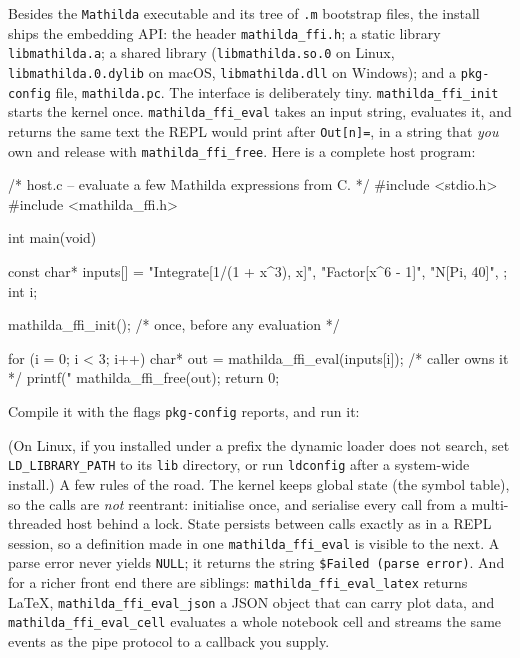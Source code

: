 \noindent
Besides the \texttt{Mathilda} executable and its tree of \texttt{.m} bootstrap files,
the install ships the embedding API: the header \texttt{mathilda\_ffi.h}; a static
library \texttt{libmathilda.a}; a shared library (\texttt{libmathilda.so.0} on Linux,
\texttt{libmathilda.0.dylib} on macOS, \texttt{libmathilda.dll} on Windows); and a
\texttt{pkg-config} file, \texttt{mathilda.pc}. The interface is deliberately tiny.
\texttt{mathilda\_ffi\_init} starts the kernel once. \texttt{mathilda\_ffi\_eval} takes
an input string, evaluates it, and returns the same text the REPL would print after
\texttt{Out[n]=}, in a string that \emph{you} own and release with
\texttt{mathilda\_ffi\_free}. Here is a complete host program:

\begin{ccode}
/* host.c -- evaluate a few Mathilda expressions from C. */
#include <stdio.h>
#include <mathilda_ffi.h>

int main(void)
{
    const char* inputs[] = {
        "Integrate[1/(1 + x^3), x]",
        "Factor[x^6 - 1]",
        "N[Pi, 40]",
    };
    int i;

    mathilda_ffi_init();                 /* once, before any evaluation */

    for (i = 0; i < 3; i++) {
        char* out = mathilda_ffi_eval(inputs[i]);   /* caller owns it */
        printf("%
        mathilda_ffi_free(out);
    }
    return 0;
}
\end{ccode}

\noindent
Compile it with the flags \texttt{pkg-config} reports, and run it:


\noindent
(On Linux, if you installed under a prefix the dynamic loader does not search, set
\texttt{LD\_LIBRARY\_PATH} to its \texttt{lib} directory, or run \texttt{ldconfig}
after a system-wide install.) A few rules of the road. The kernel keeps global state
(the symbol table), so the calls are \emph{not} reentrant: initialise once, and
serialise every call from a multi-threaded host behind a lock. State persists between
calls exactly as in a REPL session, so a definition made in one
\texttt{mathilda\_ffi\_eval} is visible to the next. A parse error never yields
\texttt{NULL}; it returns the string \texttt{\$Failed (parse error)}. And for a
richer front end there are siblings: \texttt{mathilda\_ffi\_eval\_latex} returns
\LaTeX, \texttt{mathilda\_ffi\_eval\_json} a JSON object that can carry plot data,
and \texttt{mathilda\_ffi\_eval\_cell} evaluates a whole notebook cell and streams
the same events as the pipe protocol to a callback you supply.

